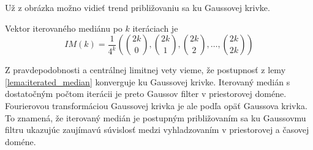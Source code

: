 Už z obrázka možno vidieť trend približovaniu sa ku Gaussovej krivke.
\begin{lema}
    Vektor iterovaného mediánu po $k$ iteráciach je
    \begin{equation}
        IM(k) = \frac{1}{4^k} 
            (\binom{2k}{0}, \binom{2k}{1}, \binom{2k}{2}, \dots,
                \binom{2k}{2k})
    \end{equation}
    \label{lema:iterated_median}
\end{lema}
Z pravdepodobnosti a centrálnej limitnej vety vieme, že postupnosť z
lemy \ref{lema:iterated_median} konverguje ku Gaussovej krivke.
Iterovaný medián s dostatočným počtom iterácii je preto Gaussov filter
v priestorovej doméne. Fourierovou transformáciou Gaussovej krivka je
ale podľa \todo{} opäť Gaussova krivka.
To znamená, že iterovaný medián je postupným približovaním sa ku
Gaussovmu filtru ukazujúc zaujímavú súvislosť medzi vyhladzovaním v
priestorovej a časovej doméne.

